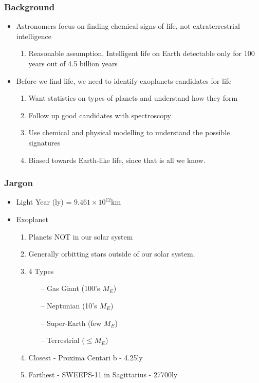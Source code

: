 \documentclass{beamer}
\begin{document}
\begin{frame}
\frametitle{Background}
\begin{itemize}
    \item Astronomers focus on finding chemical signs of life, not extraterrestrial intelligence
    \pause
    \begin{enumerate}
        \item Reasonable assumption. Intelligent life on Earth detectable only for
              100 years out of 4.5 billion years
        \pause
    \end{enumerate}
    \item Before we find life, we need to identify exoplanets candidates for life
    \pause
    \begin{enumerate}
        \item Want statistics on types of planets and understand how they form
        \pause
        \item Follow up good candidates with spectroscopy 
        \pause
        \item Use chemical and physical modelling to understand the possible signatures
        \pause
        \item Biased towards Earth-like life, since that is all we know.
    \end{enumerate}
\end{itemize}
\end{frame}


\begin{frame}
\frametitle{Jargon}
\begin{itemize}
    \item Light Year (ly) = $9.461\times 10^{12}$km
    \pause
    \item Exoplanet
    \pause
    \begin{enumerate}
        \item Planets NOT in our solar system
        \pause 
        \item Generally orbitting stars outside of our solar system.
        \pause
        \item 4 Types
        \pause
        \begin{itemize}
            \item[--] Gas Giant (100's $M_{E}$)
            \pause
            \item[--] Neptunian (10's $M_{E}$)
            \pause
            \item[--] Super-Earth (few $M_{E}$)
            \pause
            \item[--] Terrestrial ($\leq M_{E}$)
        \end{itemize}
        \pause
        \item Closest - Proxima Centari b - 4.25ly
        \pause
        \item Farthest - SWEEPS-11 in Sagittarius - 27700ly
    \end{enumerate}
\end{itemize}
\end{frame}
\end{document}
